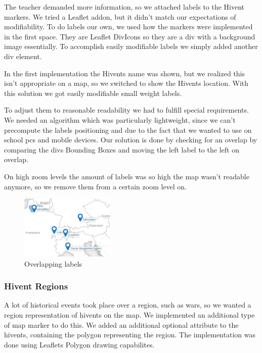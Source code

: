 The teacher demanded more information, so we attached labels to the Hivent markers.
We tried a Leaflet addon, but it didn't match our expectations of modifiability.
To do labels our own, we used how the markers were implemented in the first space. They are Leaflet DivIcons so they are a div with a background image essentially. To accomplish easily modifiable labels we simply added another div element.

In the first implementation the Hivents name was shown, but we realized this isn't appropriate on a map, so we switched to show the Hivents location. With this solution we got easily modifiable small weight labels.

To adjust them to reasonable readability we had to fulfill special requirements.
We needed an algorithm which was  particularly lightweight, since we can't precompute the labels positioning and due to the fact that we wanted to use \HG on school pcs and mobile devices.
Our solution is done by checking for an overlap by comparing the divs Bounding Boxes and moving the left label to the left on overlap.

On high zoom levels the amount of labels was so high the map wasn't readable anymore, so we remove them from a certain zoom level on.

  \begin{figure}[H]
\begin{center}
  \includegraphics[width=0.4\textwidth]{graphics/overlapping_labels_2.png}
  \end{center}

  \caption{Overlapping labels}
  \label{fig:overlapping_labels}
  \end{figure}

\subsubsection{Hivent Regions}
A lot of historical events took place over a region, such as wars, so we wanted a region representation of hivents on the map.
We implemented an additional type of map marker to do this.
We added an additional optional attribute to the hivents, containing the polygon representing the region.
The implementation was done using Leaflets Polygon drawing capabilites.

